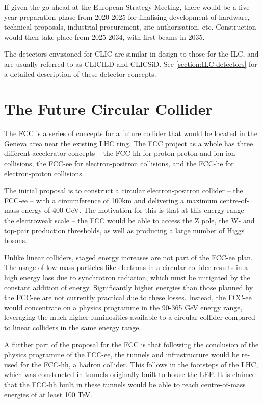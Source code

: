 If given the go-ahead at the European Strategy Meeting, there would be a five-year preparation phase from 2020-2025 for finalising development of hardware, technical proposals, industrial procurement, site authorisation, etc. Construction would then take place from 2025-2034, with first beams in 2035.

The detectors envisioned for \acrshort{CLIC} are similar in design to those for the \acrshort{ILC}, and are usually referred to as CLIC\textunderscore ILD and CLIC\textunderscore SiD. See \ref{section:ILC-detectors} for a detailed description of these detector concepts.

\section{The Future Circular Collider}
The \acrfull{FCC} is a series of concepts for a future collider that would be located in the Geneva area near the existing LHC ring. The \acrshort{FCC} project as a whole has three different accelerator concepts -- the FCC-hh for proton-proton and ion-ion collisions, the FCC-ee for electron-positron collisions, and the FCC-he for electron-proton collisions.

The initial proposal is to construct a circular electron-positron collider -- the FCC-ee -- with a circumference of 100km and delivering a maximum centre-of-mass energy of 400 GeV. The motivation for this is that at this energy range -- the electroweak scale -- the \acrshort{FCC} would be able to access the Z pole, the W- and top-pair production thresholds, as well as producing a large number of Higgs bosons. 

Unlike linear colliders, staged energy increases are not part of the FCC-ee plan. The usage of low-mass particles like electrons in a circular collider results in a high energy loss due to synchrotron radiation, which must be mitigated by the constant addition of energy. Significantly higher energies than those planned by the FCC-ee are not currently practical due to these losses. Instead, the FCC-ee would concentrate on a physics programme in the 90-365 GeV energy range, leveraging the much higher luminosities available to a circular collider compared to linear colliders in the same energy range.

A further part of the proposal for the \acrshort{FCC} is that following the conclusion of the physics programme of the FCC-ee, the tunnels and infrastructure would be re-used for the FCC-hh, a hadron collider. This follows in the footsteps of the \acrshort{LHC}, which was constructed in tunnels originally built to house the \acrfull{LEP}. It is claimed that the FCC-hh built in these tunnels would be able to reach centre-of-mass energies of at least 100 TeV.


